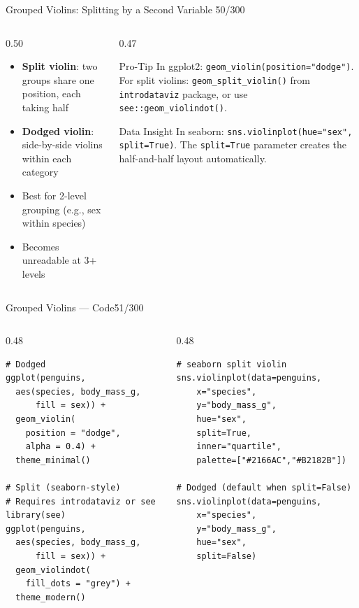 \documentclass[10pt]{beamer}
\newcommand{\smark}[1]{\hfill{\scriptsize\color{codegray}#1}}
\begin{document}
\begin{frame}{Grouped Violins: Splitting by a Second Variable}
\smark{50/300}
\begin{columns}[T]
\begin{column}{0.50\textwidth}
\begin{itemize}
    \item \textbf{Split violin}: two groups share one position, each taking half
    \item \textbf{Dodged violin}: side-by-side violins within each category
    \item Best for 2-level grouping (e.g., sex within species)
    \item Becomes unreadable at 3+ levels
\end{itemize}
\end{column}
\begin{column}{0.47\textwidth}
\begin{alertblock}{Pro-Tip}
    \scriptsize In ggplot2: \texttt{geom\_violin(position="dodge")}. For split violins: \texttt{geom\_split\_violin()} from \texttt{introdataviz} package, or use \texttt{see::geom\_violindot()}.
\end{alertblock}
\vspace{0.2cm}
\begin{exampleblock}{Data Insight}
    \scriptsize In seaborn: \texttt{sns.violinplot(hue="sex", split=True)}. The \texttt{split=True} parameter creates the half-and-half layout automatically.
\end{exampleblock}
\end{column}
\end{columns}
\end{frame}

\begin{frame}[fragile]{Grouped Violins --- Code}\smark{51/300}
\begin{columns}[T]
\begin{column}{0.48\textwidth}
\begin{lstlisting}[style=Rstyle]
# Dodged
ggplot(penguins,
  aes(species, body_mass_g,
      fill = sex)) +
  geom_violin(
    position = "dodge",
    alpha = 0.4) +
  theme_minimal()

# Split (seaborn-style)
# Requires introdataviz or see
library(see)
ggplot(penguins,
  aes(species, body_mass_g,
      fill = sex)) +
  geom_violindot(
    fill_dots = "grey") +
  theme_modern()
\end{lstlisting}
\end{column}
\begin{column}{0.48\textwidth}
\begin{lstlisting}[style=Pystyle]
# seaborn split violin
sns.violinplot(data=penguins,
    x="species",
    y="body_mass_g",
    hue="sex",
    split=True,
    inner="quartile",
    palette=["#2166AC","#B2182B"])

# Dodged (default when split=False)
sns.violinplot(data=penguins,
    x="species",
    y="body_mass_g",
    hue="sex",
    split=False)
\end{lstlisting}
\end{column}
\end{columns}
\end{frame}
\end{document}
